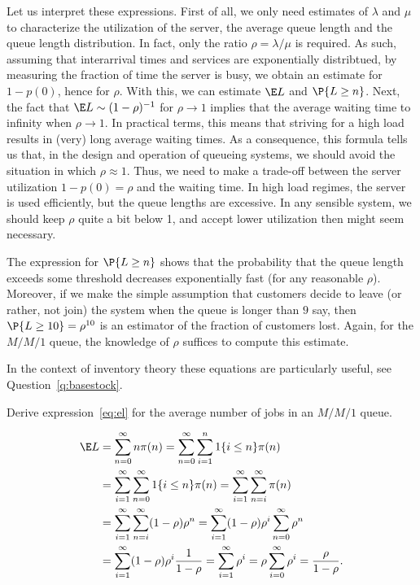 Let us interpret these expressions. First of all, we only need
estimates of $\lambda$ and $\mu$ to characterize the utilization of
the server, the average queue length and the queue length
distribution. In fact, only the ratio $\rho=\lambda/\mu$ is required.
As such, assuming that interarrival times and services are
exponentially distribtued, by measuring the fraction of time the
server is busy, we obtain an estimate for $1-p(0)$, hence for $\rho$.
With this, we can estimate $\E L$ and $\P{L\geq n}$.  Next, the fact
that $\E L \sim (1-\rho)^{-1}$ for $\rho\to 1$ implies that the
average waiting time  to
infinity when $\rho\to1$.  In practical terms, this means that
striving for a high load results in (very) long average waiting
times. As a consequence, this formula tells us that, in the design and
operation of queueing systems, we should avoid the situation in which
$\rho\approx 1$. Thus, we need to make a trade-off between the server
utilization $1-p(0) = \rho$ and the waiting time. In high load
regimes, the server is used efficiently, but the queue lengths are
excessive. In any sensible system, we should keep $\rho$ quite a bit
below 1, and accept lower utilization then might seem necessary.

The expression for $\P{L\geq n}$ shows that the probability that the
queue length exceeds some threshold decreases exponentially fast (for
any reasonable $\rho$). Moreover, if we make the simple assumption
that customers decide to leave (or rather, not join) the system when
the queue is longer than $9$ say, then $\P{L\geq 10} = \rho^{10}$ is
an estimator of the fraction of customers lost. Again, for the $M/M/1$
queue, the knowledge of $\rho$ suffices to compute this estimate.

In the context of inventory theory these equations are particularly useful, see Question~\ref{q:basestock}.

\begin{question}
  Derive expression~\ref{eq:el} for the average number of jobs in an
  $M/M/1$ queue.  
  \begin{solution}
    \begin{equation*}
      \begin{split}
\E L 
&= \sum_{n=0}^\infty n\pi(n) 
= \sum_{n=0}^\infty \sum_{i=1}^n 1\{i\leq n\} \pi(n) \\        
&= \sum_{i=1}^\infty \sum_{n=0}^\infty  1\{i\leq n\} \pi(n) 
= \sum_{i=1}^\infty \sum_{n=i}^\infty \pi(n) \\
&= \sum_{i=1}^\infty \sum_{n=i}^\infty (1-\rho)\rho^n         
= \sum_{i=1}^\infty (1-\rho)\rho^i \sum_{n=0}^\infty \rho^n \\
&= \sum_{i=1}^\infty (1-\rho)\rho^i \frac1{1-\rho}   
= \sum_{i=1}^\infty \rho^i = \rho \sum_{i=0}^\infty \rho^i = \frac{\rho}{1-\rho}.
      \end{split}
    \end{equation*}
  \end{solution}
\end{question}

